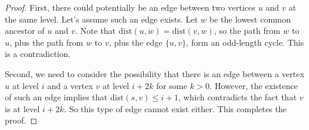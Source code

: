 \begin{flex}
\begin{proof}
First, there could potentially be an edge between two vertices $u$ and $v$ at the same level. Let's assume such an edge exists. Let $w$ be the lowest common ancestor of $u$ and $v$. Note that $\text{dist}(u,w) = \text{dist}(v,w)$, so the path from $w$ to $u$, plus the path from $w$ to $v$, plus the edge $\{u,v\}$, form an odd-length cycle. This is a contradiction. 

Second, we need to consider the possibility that there is an edge between a vertex $u$ at level $i$ and a vertex $v$ at level $i + 2k$ for some $k > 0$. However, the existence of such an edge implies that $\text{dist}(s,v) \leq i+1$, which contradicts the fact that $v$ is at level $i+2k$. So this type of edge cannot exist either. This completes the proof.
\end{proof}
\end{flex}


